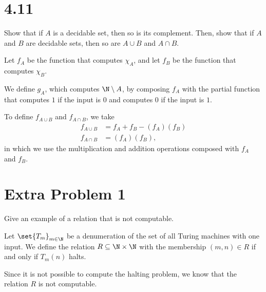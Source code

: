 \documentclass[10pt]{mypackage}
\begin{document}
\RaggedRight
\section{4.11}%
\begin{problem}
  Show that if $A$ is a decidable set, then so is its complement. Then, show that if $A$ and $B$ are decidable sets, then so are $A\cup B$ and $A\cap B$.
\end{problem}
\begin{solution}
  Let $f_A$ be the function that computes $\chi_A$, and let $f_B$ be the function that computes $\chi_B$.\newline

  We define $g_A$, which computes $\N\setminus A$, by composing $f_A$ with the partial function that computes $1$ if the input is $0$ and computes $0$ if the input is $1$.\newline

  To define $f_{A\cup B}$ and $f_{A\cap B}$, we take
  \begin{align*}
    f_{A\cup B} &= f_A + f_B - \left(f_A\right)\left(f_B\right)\\
    f_{A\cap B} &= \left(f_A\right)\left(f_B\right),
  \end{align*}
  in which we use the multiplication and addition operations composed with $f_A$ and $f_B$.
\end{solution}
\section{Extra Problem 1}%
\begin{problem}
  Give an example of a relation that is not computable.
\end{problem}
\begin{solution}
  Let $\set{T_m}_{m\in\N}$ be a denumeration of the set of all Turing machines with one input. We define the relation $R\subseteq \N\times \N$ with the membership $\left(m,n\right)\in R$ if and only if $T_{m}\left(n\right)$ halts.\newline

  Since it is not possible to compute the halting problem, we know that the relation $R$ is not computable.
\end{solution}
\end{document}

